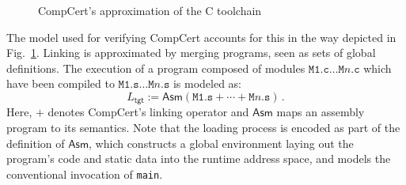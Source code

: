 \documentclass[acmsmall,authordraft]{acmart}
\newcommand{\kw}[1]{\ensuremath{ \mathsf{#1} }}
\begin{document}
\begin{figure} %
    \caption{CompCert's approximation of the C toolchain}
    \label{fig:process}
\end{figure}

The model used for verifying CompCert accounts for
this in the way
depicted in Fig.~\ref{fig:process}.
Linking is approximated by
merging programs, seen as sets of global definitions.
The execution
of a program composed of modules
$\texttt{M1.c} \ldots \texttt{M$n$.c}$
which have been compiled to
$\texttt{M1.s} \ldots \texttt{M$n$.s}$
is modeled as:
\[
    L_\kw{tgt} :=
    \kw{Asm}(\texttt{M1.s} +
             \cdots +
             \texttt{M$n$.s}) \,.
\]
Here,
$+$ denotes CompCert's linking operator and
$\kw{Asm}$ maps an assembly program to its semantics.
Note that the loading process is encoded
as part of the definition of $\kw{Asm}$,
which constructs a global environment
laying out the program's code and static data
into the runtime address space,
and models the conventional invocation of \texttt{main}.
\end{document}
